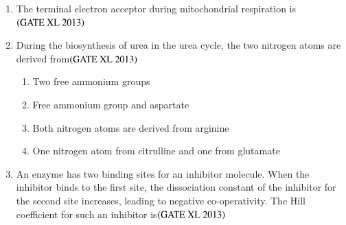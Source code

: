 \documentclass[journal]{IEEEtran}
\begin{document}
\begin{enumerate}
\item The terminal electron acceptor during mitochondrial respiration is\hfill $\left(\text{GATE XL 2013}\right)$
\begin{enumerate}
\end{enumerate}

\item During the biosynthesis of urea in the urea cycle, the two nitrogen atoms are derived from\hfill $\left(\text{GATE XL 2013}\right)$
\begin{enumerate}
    \item Two free ammonium groups
    \item Free ammonium group and aspartate
    \item Both nitrogen atoms are derived from arginine
    \item One nitrogen atom from citrulline and one from glutamate
\end{enumerate}

\item An enzyme has two binding sites for an inhibitor molecule. When the inhibitor binds to the first site, the dissociation constant of the inhibitor for the second site increases, leading to negative co-operativity. The Hill coefficient for such an inhibitor is\hfill $\left(\text{GATE XL 2013}\right)$
\begin{enumerate}
\end{enumerate}


\end{enumerate}
\end{document}
